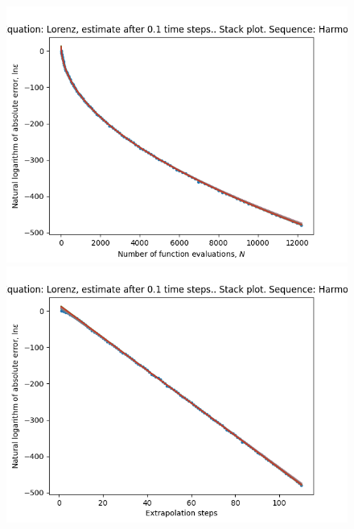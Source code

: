 \begin{figure}[H]
\centering
\begin{minipage}{0.45\textwidth}
\centering
\includegraphics[scale=0.45]{../results/emr_plots/lorenz_hp_harmonic_stack.png}
\end{minipage}
\begin{minipage}{0.45\textwidth}
\centering
\includegraphics[scale=0.45]{../results/emr_plots/lorenz_hp_harmonic_steps_stack.png}
\end{minipage}
\end{figure}

